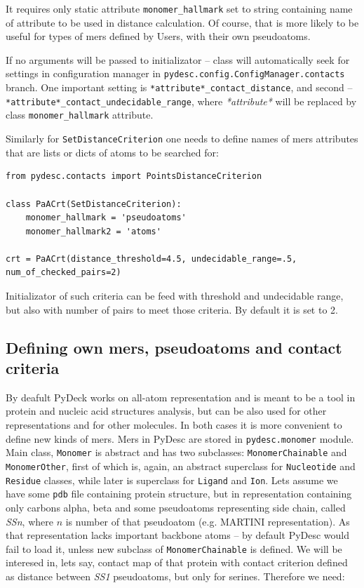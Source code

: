 \documentclass{article}
\begin{document}
It requires only static attribute \texttt{monomer\_{}hallmark} set to string containing name of attribute to be used in distance calculation. Of course, that is more likely to be useful for types of mers defined by Users, with their own pseudoatoms.

If no arguments will be passed to initializator -- class will automatically seek for settings in configuration manager in \texttt{pydesc.config.ConfigManager.contacts} branch. One important setting is \texttt{*attribute*\_contact\_distance}, and second -- \texttt{*attribute*\_contact\_undecidable\_range}, where \textit{*attribute*} will be replaced by class \texttt{monomer\_{}hallmark} attribute.

Similarly for \texttt{SetDistanceCriterion} one needs to define names of mers attributes that are lists or dicts of atoms to be searched for:

\begin{lstlisting}
from pydesc.contacts import PointsDistanceCriterion

class PaACrt(SetDistanceCriterion):
    monomer_hallmark = 'pseudoatoms'
    monomer_hallmark2 = 'atoms'

crt = PaACrt(distance_threshold=4.5, undecidable_range=.5, num_of_checked_pairs=2)
\end{lstlisting}

Initializator of such criteria can be feed with threshold and undecidable range, but also with number of pairs to meet those criteria. By default it is set to 2.

%
%
\subsection{Defining own mers, pseudoatoms and contact criteria}

By deafult PyDeck works on all-atom representation and is meant to be a tool in protein and nucleic acid structures analysis, but can be also used for other representations and for other molecules. In both cases it is more convenient to define new kinds of mers. Mers in PyDesc are stored in \texttt{pydesc.monomer} module. Main class, \texttt{Monomer} is abstract and has two subclasses: \texttt{MonomerChainable} and \texttt{MonomerOther}, first of which is, again, an abstract superclass for \texttt{Nucleotide} and \texttt{Residue} classes, while later is superclass for \texttt{Ligand} and \texttt{Ion}. Lets assume we have some \texttt{pdb} file containing protein structure, but in representation containing only carbons alpha, beta and some pseudoatoms representing side chain, called \textit{SSn}, where $n$ is number of that pseudoatom (e.g. MARTINI representation). As that representation lacks important backbone atoms -- by default PyDesc would fail to load it, unless new subclass of \texttt{MonomerChainable} is defined. We will be interesed in, lets say, contact map of that protein with contact criterion defined as distance between \textit{SS1} pseudoatoms, but only for serines. Therefore we need:
\end{document}
